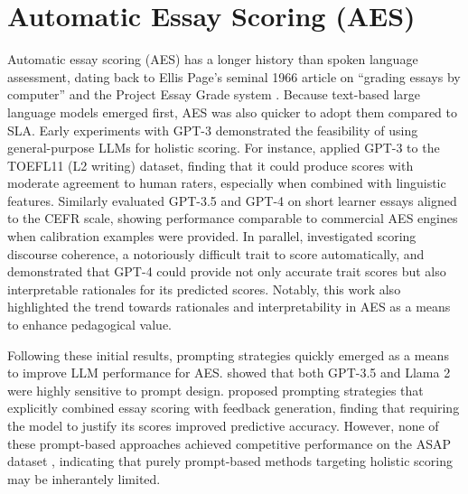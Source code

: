 \documentclass{report}
\begin{document}
\section{Automatic Essay Scoring (AES)}
\label{sec:automatic_essay_scoring}
Automatic essay scoring (AES) has a longer history than spoken language assessment, dating back to Ellis Page’s seminal 1966 article on “grading essays by computer” and the Project Essay Grade system \citep{page1966}. Because text-based large language models emerged first, AES was also quicker to adopt them compared to SLA. Early experiments with GPT-3 demonstrated the feasibility of using general-purpose LLMs for holistic scoring. For instance, \citet{aes_gpt3} applied GPT-3 \citep{gpt3} to the TOEFL11 (L2 writing) dataset, finding that it could produce scores with moderate agreement to human raters, especially when combined with linguistic features. Similarly \citet{yancey-etal-2023-rating} evaluated GPT-3.5 and GPT-4 \citep{openai2024gpt4technicalreport} on short learner essays aligned to the CEFR scale, showing performance comparable to commercial AES engines when calibration examples were provided. In parallel, \citet{naismith-etal-2023-automated} investigated scoring discourse coherence, a notoriously difficult trait to score automatically, and demonstrated that GPT-4 could provide not only accurate trait scores but also interpretable rationales for its predicted scores. Notably, this work also highlighted the trend towards rationales and interpretability in AES as a means to enhance pedagogical value.

Following these initial results, prompting strategies quickly emerged as a means to improve LLM performance for AES. \citet{mansour2024largelanguagemodelsautomatically} showed that both GPT-3.5 and Llama 2 \citep{touvron2023llama2openfoundation} were highly sensitive to prompt design. \citet{stahl2024exploringllmpromptingstrategies} proposed prompting strategies that explicitly combined essay scoring with feedback generation, finding that requiring the model to justify its scores improved predictive accuracy. However, none of these prompt-based approaches achieved competitive performance on the ASAP dataset  \citep{mathias-bhattacharyya-2018-asap}, indicating that purely prompt-based methods targeting holistic scoring may be inherantely limited.
\end{document}
